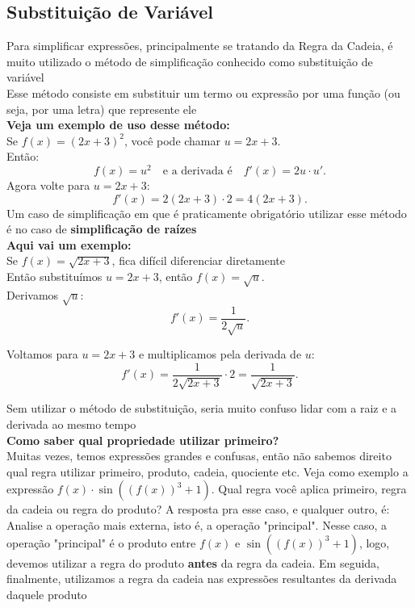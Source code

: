 \documentclass{article}
\begin{document}
\subsection{Substituição de Variável}
Para simplificar expressões, principalmente se tratando da Regra da Cadeia, é muito utilizado o método de simplificação conhecido como substituição de variável
\\[10pt]
Esse método consiste em substituir um termo ou expressão por uma função (ou seja, por uma letra) que represente ele
\\[10pt]
\textbf{Veja um exemplo de uso desse método:}\\[10pt]
Se \( f(x) = (2x + 3)^2 \), você pode chamar \( u = 2x + 3 \).
\\[10pt]
\noindent Então:
\[
f(x) = u^2 \quad \text{e a derivada é} \quad f'(x) = 2u \cdot u'.
\]
Agora volte para \( u = 2x + 3 \):
\[
f'(x) = 2(2x + 3) \cdot 2 = 4(2x + 3).
\]
\noindent Um caso de simplificação em que é praticamente obrigatório utilizar esse método é no caso de \textbf{simplificação de raízes}
\\[10pt]
\textbf{Aqui vai um exemplo:}
\\[10pt]
Se \( f(x) = \sqrt{2x + 3} \), fica difícil diferenciar diretamente
\\[10pt]
Então substituímos \( u = 2x + 3 \), então \( f(x) = \sqrt{u} \).
\\[10pt]
Derivamos \( \sqrt{u} \):
\[
f'(x) = \frac{1}{2\sqrt{u}}.
\]

\noindent Voltamos para \( u = 2x + 3 \) e multiplicamos pela derivada de \( u \):
\[
f'(x) = \frac{1}{2\sqrt{2x + 3}} \cdot 2 = \frac{1}{\sqrt{2x + 3}}.
\]

\noindent Sem utilizar o método de substituição, seria muito confuso lidar com a raiz e a derivada ao mesmo tempo
\\[10pt]
\textbf{Como saber qual propriedade utilizar primeiro?}
\\
Muitas vezes, temos expressões grandes e confusas, então não sabemos direito qual regra utilizar primeiro, produto, cadeia, quociente etc. Veja como exemplo a expressão $f(x) \cdot \sin((f(x))^3 + 1)$. Qual regra você aplica primeiro, regra da cadeia ou regra do produto? A resposta pra esse caso, e qualquer outro, é: Analise a operação mais externa, isto é, a operação "principal". Nesse caso, a operação "principal" é o produto entre $f(x)$ e $\sin((f(x))^3 + 1)$, logo, devemos utilizar a regra do produto \textbf{antes} da regra da cadeia. Em seguida, finalmente, utilizamos a regra da cadeia nas expressões resultantes da derivada daquele produto
\end{document}
